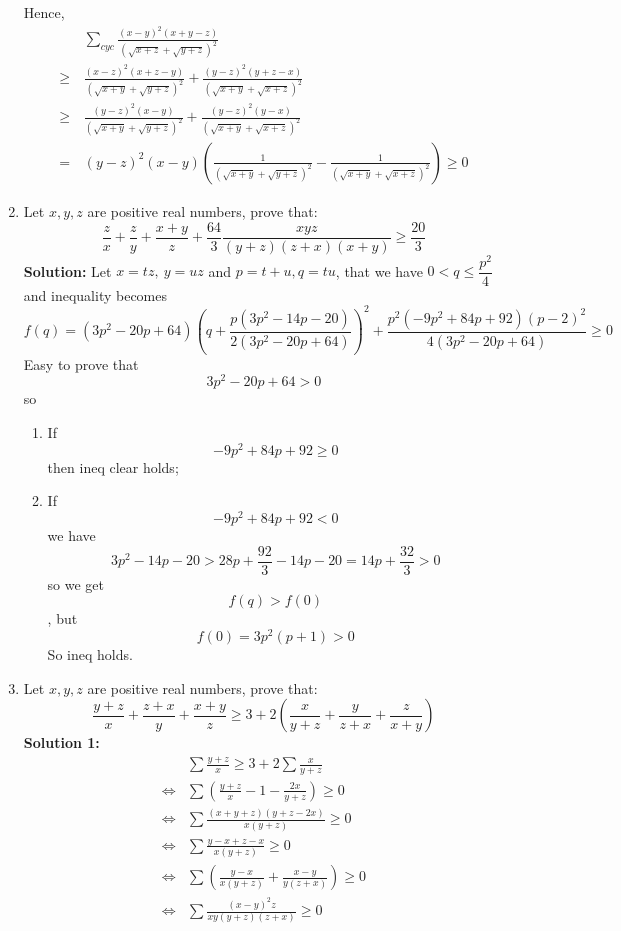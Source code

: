 \documentclass{report}
\begin{document}
\begin{enumerate}
	Hence,\begin{align*}
	&\,\sum_{cyc}\frac{(x-y)^2(x+y-z)}{\left(\sqrt{x+z}+\sqrt{y+z}\right)^2}\\
	\geq&\,\frac{(x-z)^2(x+z-y)}{\left(\sqrt{x+y}+\sqrt{y+z}\right)^2}+\frac{(y-z)^2(y+z-x)}{\left(\sqrt{x+y}+\sqrt{x+z}\right)^2}\\
	\geq&\,\frac{(y-z)^2(x-y)}{\left(\sqrt{x+y}+\sqrt{y+z}\right)^2}+\frac{(y-z)^2(y-x)}{\left(\sqrt{x+y}+\sqrt{x+z}\right)^2}\\
	=&\,(y-z)^2(x-y)\left(\frac{1}{\left(\sqrt{x+y}+\sqrt{y+z}\right)^2}-\frac{1}{\left(\sqrt{x+y}+\sqrt{x+z}\right)^2}\right)\geq0
	\end{align*}
	\begin{flushright}
	\end{flushright}
	\item Let $x,y,z$ are positive real numbers, prove that:\[ \frac{z}{x}+\frac{z}{y}+\frac{x+y}{z}+\frac{64}{3}\frac{xyz}{(y+z)(z+x)(x+y)} \geq \frac{20}{3}\]
	\textbf{Solution:} Let $ x = tz,\ y = uz$ and $ p = t + u, q = tu$, that we have $ 0 < q \le \dfrac{p^2}{4}$ and inequality becomes$$ f(q) = (3{p}^{2} - 20p + 64)\left(q + \frac {p(3{p}^{2} - 14p - 20)}{2(3{p}^{2} - 20p + 64)}\right)^{2} + \frac {{p}^{2}( - 9{p}^{2} + 84p + 92)(p - 2)^{2}}{4(3{p}^{2} - 20p + 64)} \ge 0$$
	Easy to prove that $$ 3{p}^{2} - 20p + 64 > 0$$so\begin{enumerate}
		\item If $$ - 9{p}^{2} + 84p + 92 \ge 0$$ then ineq clear holds;
		\item If $$ - 9{p}^{2} + 84p + 92 < 0$$ we have $$ 3{p}^{2} - 14p - 20 > 28p + \frac {92}{3} - 14p - 20 = 14p + \frac {32}{3} > 0$$ so we get $$ f(q) > f(0)$$, but $$ f(0) = 3p^2(p + 1) > 0$$So ineq holds.
	\end{enumerate} 
	\begin{flushright}
	\end{flushright}
	\item Let $x,y,z$ are positive real numbers, prove that:$$ \frac{y+z}{x}+\frac{z+x}{y}+\frac{x+y}{z}\geq3+2\left( \frac{x}{y+z}+\frac{y}{z+x}+\frac{z}{x+y}\right) $$
	\textbf{Solution 1:}\begin{align*}
	&\sum{\frac{y+z}{x}} \ge 3+2\sum{\frac{x}{y+z}}\\
	\iff & \sum{\left(\frac{y+z}{x}-1-\frac{2x}{y+z}\right)} \ge 0\\
	\iff & \sum{\frac{(x+y+z)(y+z-2x)}{x(y+z)}} \ge 0\\
	\iff & \sum{\frac{y-x+z-x}{x(y+z)}} \ge 0\\
	\iff &\sum{\left(\frac{y-x}{x(y+z)}+\frac{x-y}{y(z+x)}\right)} \ge 0\\
	\iff & \sum{\frac{(x-y)^2z}{xy(y+z)(z+x)}} \ge 0
	\end{align*}
	

\end{enumerate}
\end{document}
